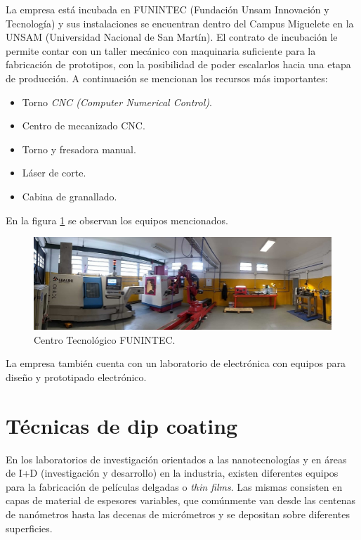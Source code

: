 La empresa está incubada en FUNINTEC (Fundación Unsam Innovación y Tecnología) y sus instalaciones se encuentran dentro del Campus Miguelete en la UNSAM (Universidad Nacional de San Martín). El contrato de incubación le permite contar con un taller mecánico con maquinaria suficiente para la fabricación de  prototipos, con la posibilidad de poder escalarlos hacia una etapa de producción. A continuación se mencionan los recursos más importantes:
 
\begin{itemize}
\item Torno \textit{CNC (Computer Numerical Control)}.
\item Centro de mecanizado CNC.
\item Torno y fresadora manual.
\item Láser de corte.
\item Cabina de granallado.
\end{itemize}

En la figura \ref{fig:taller} se observan los equipos mencionados.

\begin{figure}[htpb]
\centering 
\includegraphics[width=1\textwidth]{./Figures/taller.jpg}
\caption{Centro Tecnológico FUNINTEC.}
\label{fig:taller}
\end{figure}

La empresa también cuenta con un laboratorio de electrónica con equipos para diseño y prototipado electrónico.

\section{Técnicas de dip coating}

En los laboratorios de investigación orientados a las nanotecnologías y en áreas de I+D (investigación y desarrollo) en la industria, existen diferentes equipos para la fabricación de películas delgadas o \textit{thin films}. Las mismas consisten en capas de material de espesores variables, que comúnmente van desde las centenas de nanómetros hasta las decenas de micrómetros y se depositan sobre diferentes superficies.


